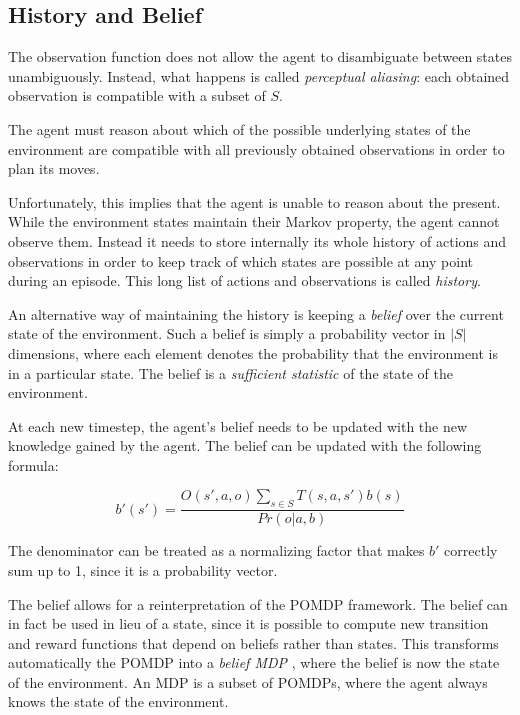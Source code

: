 \subsection{History and Belief}

The observation function does not allow the agent to disambiguate between states unambiguously.
Instead, what happens is called \textit{perceptual aliasing}: each obtained observation is
compatible with a subset of $S$.

The agent must reason about which of the possible underlying states of the environment are
compatible with all previously obtained observations in order to plan its moves.

Unfortunately, this implies that the agent is unable to reason about the present. While the
environment states maintain their Markov property, the agent cannot observe them. Instead it needs
to store internally its whole history of actions and observations in order to keep track of which
states are possible at any point during an episode. This long list of actions and observations is
called \textit{history}.

An alternative way of maintaining the history is keeping a \textit{belief} over the current state of
the environment. Such a belief is simply a probability vector in $|S|$ dimensions, where each
element denotes the probability that the environment is in a particular state. The belief is a
\textit{sufficient statistic} of the state of the environment. 

At each new timestep, the agent's belief needs to be updated with the new knowledge gained by the
agent. The belief can be updated with the following formula:

\begin{equation}
 b'(s') = \frac{O(s', a, o)\sum_{s\in S}T(s,a,s')b(s)}{Pr(o|a,b)}
\end{equation}

The denominator can be treated as a normalizing factor that makes $b'$ correctly sum up to 1, since
it is a probability vector.

The belief allows for a reinterpretation of the POMDP framework. The belief can in fact be used in
lieu of a state, since it is possible to compute new transition and reward functions that depend on
beliefs rather than states. This transforms automatically the POMDP into a \textit{belief MDP}
\cite{cit:pomdp}, where the belief is now the state of the environment. An MDP
\cite{cit:suttonbarto} is a subset of POMDPs, where the agent always knows the state of the
environment.


